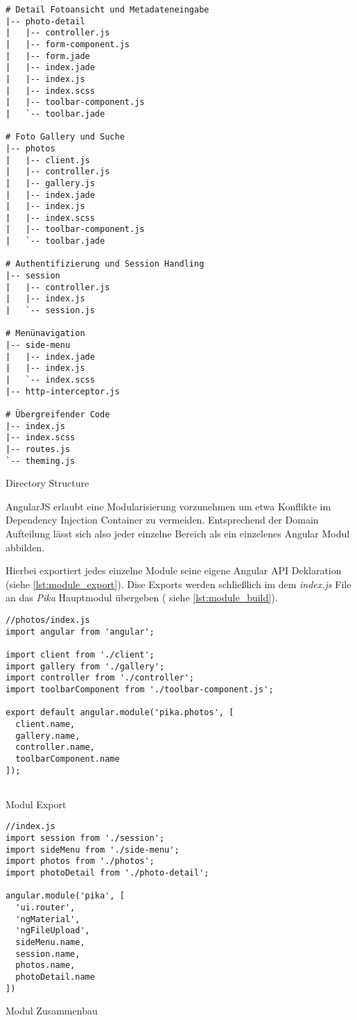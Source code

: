 \begin{listing}[H]
\begin{verbatim}
# Detail Fotoansicht und Metadateneingabe 
|-- photo-detail 
|   |-- controller.js
|   |-- form-component.js
|   |-- form.jade
|   |-- index.jade
|   |-- index.js
|   |-- index.scss
|   |-- toolbar-component.js
|   `-- toolbar.jade

# Foto Gallery und Suche
|-- photos
|   |-- client.js
|   |-- controller.js
|   |-- gallery.js
|   |-- index.jade
|   |-- index.js
|   |-- index.scss
|   |-- toolbar-component.js
|   `-- toolbar.jade

# Authentifizierung und Session Handling
|-- session
|   |-- controller.js
|   |-- index.js
|   `-- session.js

# Menünavigation
|-- side-menu
|   |-- index.jade
|   |-- index.js
|   `-- index.scss
|-- http-interceptor.js

# Übergreifender Code
|-- index.js
|-- index.scss
|-- routes.js
`-- theming.js
\end{verbatim}
\caption{Directory Structure}
\label{lst:directorty_structure}
\end{listing}

AngularJS erlaubt eine Modularisierung vorzunehmen um etwa Konflikte im Dependency Injection Container zu vermeiden. Entsprechend der Domain Aufteilung lässt sich also jeder einzelne Bereich als ein einzelenes Angular Modul abbilden.

Hierbei exportiert jedes einzelne Module seine eigene Angular API Deklaration (siehe \ref{lst:module_export}). Dise Exports werden schließlich im dem \textit{index.js} File an das \textit{Pika} Hauptmodul übergeben ( siehe \ref{lst:module_build}).


\begin{listing}[H]
\begin{verbatim}
//photos/index.js
import angular from 'angular';

import client from './client';
import gallery from './gallery';
import controller from './controller';
import toolbarComponent from './toolbar-component.js';

export default angular.module('pika.photos', [
  client.name,
  gallery.name,
  controller.name,
  toolbarComponent.name
]);
 
\end{verbatim}
\caption{Modul Export}
\label{lst:module_export}
\end{listing}

\begin{listing}[H]
\begin{verbatim}
//index.js
import session from './session';
import sideMenu from './side-menu';
import photos from './photos';
import photoDetail from './photo-detail';

angular.module('pika', [
  'ui.router',
  'ngMaterial',
  'ngFileUpload',
  sideMenu.name,
  session.name,
  photos.name,
  photoDetail.name
])
\end{verbatim}
\caption{Modul Zusammenbau}
\label{lst:module_build}
\end{listing}


